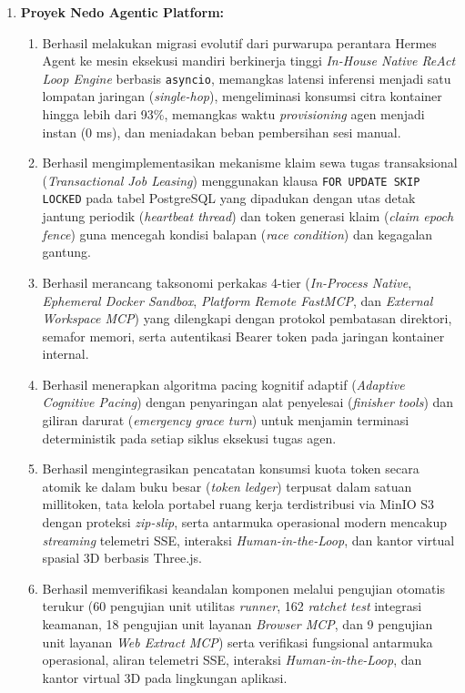 \begin{enumerate}[label=\arabic*., leftmargin=*, itemsep=0pt]
  \item \textbf{Proyek Nedo Agentic Platform:}
  \begin{enumerate}[label=\alph*., leftmargin=*, itemsep=0pt]
    \item Berhasil melakukan migrasi evolutif dari purwarupa perantara Hermes Agent ke mesin eksekusi mandiri berkinerja tinggi \textit{In-House Native ReAct Loop Engine} berbasis \texttt{asyncio}, memangkas latensi inferensi menjadi satu lompatan jaringan (\textit{single-hop}), mengeliminasi konsumsi citra kontainer hingga lebih dari 93\%, memangkas waktu \textit{provisioning} agen menjadi instan (0 ms), dan meniadakan beban pembersihan sesi manual.
    \item Berhasil mengimplementasikan mekanisme klaim sewa tugas transaksional (\textit{Transactional Job Leasing}) menggunakan klausa \texttt{FOR UPDATE SKIP LOCKED} pada tabel PostgreSQL yang dipadukan dengan utas detak jantung periodik (\textit{heartbeat thread}) dan token generasi klaim (\textit{claim epoch fence}) guna mencegah kondisi balapan (\textit{race condition}) dan kegagalan gantung.
    \item Berhasil merancang taksonomi perkakas 4-tier (\textit{In-Process Native}, \textit{Ephemeral Docker Sandbox}, \textit{Platform Remote FastMCP}, dan \textit{External Workspace MCP}) yang dilengkapi dengan protokol pembatasan direktori, semafor memori, serta autentikasi Bearer token pada jaringan kontainer internal.
    \item Berhasil menerapkan algoritma pacing kognitif adaptif (\textit{Adaptive Cognitive Pacing}) dengan penyaringan alat penyelesai (\textit{finisher tools}) dan giliran darurat (\textit{emergency grace turn}) untuk menjamin terminasi deterministik pada setiap siklus eksekusi tugas agen.
    \item Berhasil mengintegrasikan pencatatan konsumsi kuota token secara atomik ke dalam buku besar (\textit{token ledger}) terpusat dalam satuan millitoken, tata kelola portabel ruang kerja terdistribusi via MinIO S3 dengan proteksi \textit{zip-slip}, serta antarmuka operasional modern mencakup \textit{streaming} telemetri SSE, interaksi \textit{Human-in-the-Loop}, dan kantor virtual spasial 3D berbasis Three.js.
    \item Berhasil memverifikasi keandalan komponen melalui pengujian otomatis terukur (60 pengujian unit utilitas \textit{runner}, 162 \textit{ratchet test} integrasi keamanan, 18 pengujian unit layanan \textit{Browser MCP}, dan 9 pengujian unit layanan \textit{Web Extract MCP}) serta verifikasi fungsional antarmuka operasional, aliran telemetri SSE, interaksi \textit{Human-in-the-Loop}, dan kantor virtual 3D pada lingkungan aplikasi.
  \end{enumerate}


\end{enumerate}
